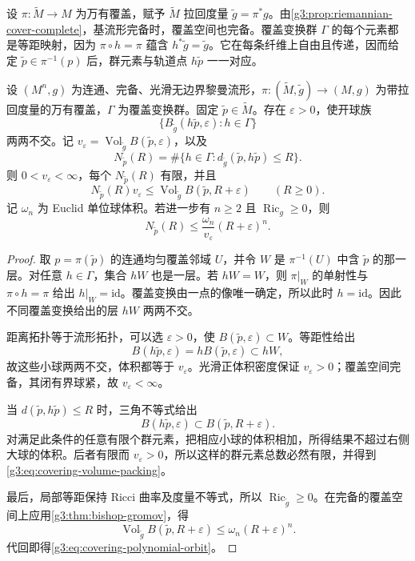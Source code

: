 设 \(\pi:\widetilde M\to M\) 为万有覆盖，赋予 \(\widetilde M\) 拉回度量 \(\widetilde g=\pi^*g\)。由\cref{g3:prop:riemannian-cover-complete}，基流形完备时，覆盖空间也完备。覆盖变换群 \(\Gamma\) 的每个元素都是等距映射，因为 \(\pi\circ h=\pi\) 蕴含 \(h^*\widetilde g=\widetilde g\)。它在每条纤维上自由且传递，因而给定 \(\widetilde p\in\pi^{-1}(p)\) 后，群元素与轨道点 \(h\widetilde p\) 一一对应。

\begin{proposition}\label{g3:prop:covering-orbit-count}
	设 \((M^n,g)\) 为连通、完备、光滑无边界黎曼流形，\(\pi:(\widetilde M,\widetilde g)\to(M,g)\) 为带拉回度量的万有覆盖，\(\Gamma\) 为覆盖变换群。固定 \(\widetilde p\in\widetilde M\)。存在 \(\varepsilon>0\)，使开球族
	\[
		\{B_{\widetilde g}(h\widetilde p,\varepsilon):h\in\Gamma\}
	\]
	两两不交。记 \(v_\varepsilon=\operatorname{Vol}_{\widetilde g}B(\widetilde p,\varepsilon)\)，以及
	\[
		N_{\widetilde p}(R)
		=\#\{h\in\Gamma:
		d_{\widetilde g}(\widetilde p,h\widetilde p)\le R\}.
	\]
	则 \(0<v_\varepsilon<\infty\)，每个 \(N_{\widetilde p}(R)\) 有限，并且
	\begin{equation}\label{g3:eq:covering-volume-packing}
		N_{\widetilde p}(R)v_\varepsilon
		\le\operatorname{Vol}_{\widetilde g}B(\widetilde p,R+\varepsilon)
		\qquad(R\ge0).
	\end{equation}
	记 \(\omega_n\) 为 Euclid 单位球体积。若进一步有 \(n\ge2\) 且 \(\operatorname{Ric}_g\ge0\)，则
	\begin{equation}\label{g3:eq:covering-polynomial-orbit}
		N_{\widetilde p}(R)
		\le\frac{\omega_n}{v_\varepsilon}(R+\varepsilon)^n.
	\end{equation}
\end{proposition}
\begin{proof}
	取 \(p=\pi(\widetilde p)\) 的连通均匀覆盖邻域 \(U\)，并令 \(W\) 是 \(\pi^{-1}(U)\) 中含 \(\widetilde p\) 的那一层。对任意 \(h\in\Gamma\)，集合 \(hW\) 也是一层。若 \(hW=W\)，则 \(\pi|_W\) 的单射性与 \(\pi\circ h=\pi\) 给出 \(h|_W=\mathrm{id}\)。覆盖变换由一点的像唯一确定，所以此时 \(h=\mathrm{id}\)。因此不同覆盖变换给出的层 \(hW\) 两两不交。

	距离拓扑等于流形拓扑，可以选 \(\varepsilon>0\)，使 \(B(\widetilde p,\varepsilon)\subset W\)。等距性给出
	\[
		B(h\widetilde p,\varepsilon)
		=hB(\widetilde p,\varepsilon)\subset hW,
	\]
	故这些小球两两不交，体积都等于 \(v_\varepsilon\)。光滑正体积密度保证 \(v_\varepsilon>0\)；覆盖空间完备，其闭有界球紧，故 \(v_\varepsilon<\infty\)。

	当 \(d(\widetilde p,h\widetilde p)\le R\) 时，三角不等式给出
	\[
		B(h\widetilde p,\varepsilon)
		\subset B(\widetilde p,R+\varepsilon).
	\]
	对满足此条件的任意有限个群元素，把相应小球的体积相加，所得结果不超过右侧大球的体积。后者有限而 \(v_\varepsilon>0\)，所以这样的群元素总数必然有限，并得到\eqref{g3:eq:covering-volume-packing}。

	最后，局部等距保持 Ricci 曲率及度量不等式，所以 \(\operatorname{Ric}_{\widetilde g}\ge0\)。在完备的覆盖空间上应用\cref{g3:thm:bishop-gromov}，得
	\[
		\operatorname{Vol}_{\widetilde g}B(\widetilde p,R+\varepsilon)
		\le\omega_n(R+\varepsilon)^n.
	\]
	代回即得\eqref{g3:eq:covering-polynomial-orbit}。
\end{proof}

